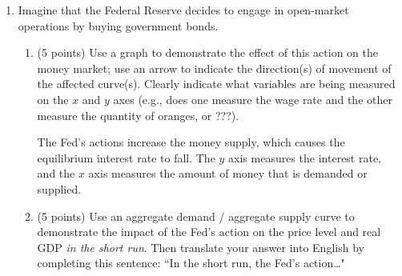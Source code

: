 \documentclass{article}
\begin{document}
\begin{enumerate}
\begin{enumerate}
    \item \begin{EXAM} (5 points) Explain why the \$14 minimum wage creates unemployment. Also: \emph{quantify} the amount of unemployment created by writing down the number of unemployed people resulting from the minimum wage. Please circle your answer. \vspace{5cm} \end{EXAM}

\begin{KEY}
At a price of \$14 per hour, 7 million workers want employment but only 3 million jobs are available. The minimum wage therefore increases unemployment by 4 million workers.
\end{KEY}

    \end{enumerate}













\item \begin{EXAM} Imagine that the Federal Reserve decides to engage in open-market operations by buying government bonds. \end{EXAM}

    \begin{enumerate}

    \item \begin{EXAM} (5 points) Use a graph to demonstrate the effect of this action on the money market; use an arrow to indicate the direction(s) of movement of the affected curve(s). Clearly indicate what variables are being measured on the $x$ and $y$ axes (e.g., does one measure the wage rate and the other measure the quantity of oranges, or ???). \vspace*{5cm} \end{EXAM}

\begin{KEY}
The Fed's actions increase the money supply, which causes the equilibrium interest rate to fall. The $y$ axis measures the interest rate, and the $x$ axis measures the amount of money that is demanded or supplied.
\end{KEY}


    \item \begin{EXAM} (5 points) Use an aggregate demand / aggregate supply curve to demonstrate the impact of the Fed's action on the price level and real GDP \emph{in the short run}. Then translate your answer into English by completing this sentence: ``In the short run, the Fed's action\ldots" \vspace{5cm} \end{EXAM}


\end{enumerate}
\end{enumerate}
\end{document}
